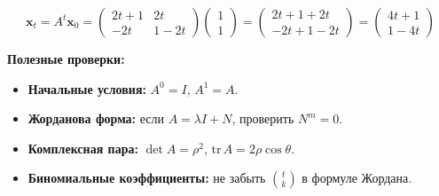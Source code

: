 $$\mathbf{x}_t = A^t\mathbf{x}_0 = \begin{pmatrix} 2t+1 & 2t \\ -2t & 1-2t \end{pmatrix}\begin{pmatrix} 1 \\ 1 \end{pmatrix} = \begin{pmatrix} 2t+1 + 2t \\ -2t + 1-2t \end{pmatrix} = \begin{pmatrix} 4t + 1 \\ 1 - 4t \end{pmatrix}$$


\textbf{Полезные проверки:}
\begin{itemize}
\item \textbf{Начальные условия:} $A^0 = I$, $A^1 = A$.
\item \textbf{Жорданова форма:} если $A = \lambda I + N$, проверить $N^m = 0$.
\item \textbf{Комплексная пара:} $\det A = \rho^2$, $\text{tr}\,A = 2\rho\cos\theta$.
\item \textbf{Биномиальные коэффициенты:} не забыть $\binom{t}{k}$ в формуле Жордана.
\end{itemize}


